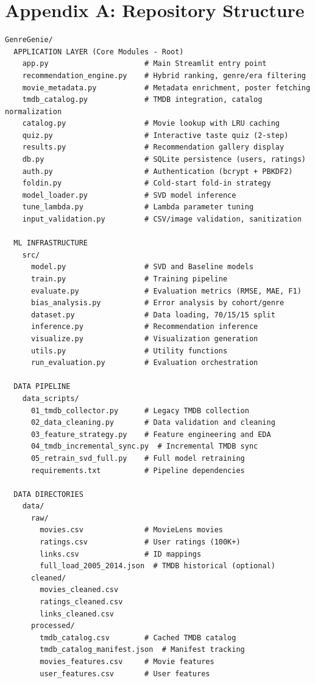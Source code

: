 \documentclass[11pt,a4paper]{article}
\begin{document}
\section*{Appendix A: Repository Structure}

\begin{verbatim}
GenreGenie/
  APPLICATION LAYER (Core Modules - Root)
    app.py                      # Main Streamlit entry point
    recommendation_engine.py    # Hybrid ranking, genre/era filtering
    movie_metadata.py           # Metadata enrichment, poster fetching
    tmdb_catalog.py             # TMDB integration, catalog normalization
    catalog.py                  # Movie lookup with LRU caching
    quiz.py                     # Interactive taste quiz (2-step)
    results.py                  # Recommendation gallery display
    db.py                       # SQLite persistence (users, ratings)
    auth.py                     # Authentication (bcrypt + PBKDF2)
    foldin.py                   # Cold-start fold-in strategy
    model_loader.py             # SVD model inference
    tune_lambda.py              # Lambda parameter tuning
    input_validation.py         # CSV/image validation, sanitization

  ML INFRASTRUCTURE
    src/
      model.py                  # SVD and Baseline models
      train.py                  # Training pipeline
      evaluate.py               # Evaluation metrics (RMSE, MAE, F1)
      bias_analysis.py          # Error analysis by cohort/genre
      dataset.py                # Data loading, 70/15/15 split
      inference.py              # Recommendation inference
      visualize.py              # Visualization generation
      utils.py                  # Utility functions
      run_evaluation.py         # Evaluation orchestration

  DATA PIPELINE
    data_scripts/
      01_tmdb_collector.py      # Legacy TMDB collection
      02_data_cleaning.py       # Data validation and cleaning
      03_feature_strategy.py    # Feature engineering and EDA
      04_tmdb_incremental_sync.py  # Incremental TMDB sync
      05_retrain_svd_full.py    # Full model retraining
      requirements.txt          # Pipeline dependencies

  DATA DIRECTORIES
    data/
      raw/
        movies.csv              # MovieLens movies
        ratings.csv             # User ratings (100K+)
        links.csv               # ID mappings
        full_load_2005_2014.json  # TMDB historical (optional)
      cleaned/
        movies_cleaned.csv
        ratings_cleaned.csv
        links_cleaned.csv
      processed/
        tmdb_catalog.csv        # Cached TMDB catalog
        tmdb_catalog_manifest.json  # Manifest tracking
        movies_features.csv     # Movie features
        user_features.csv       # User features


\end{verbatim}
\end{document}
